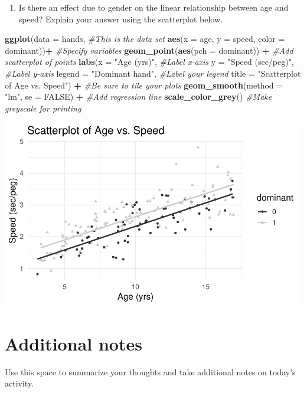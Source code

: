 \documentclass[
]{report}
\newenvironment{Shaded}{\begin{snugshade}}{\end{snugshade}}
\newcommand{\CommentTok}[1]{\textcolor[rgb]{0.56,0.35,0.01}{\textit{#1}}}
\newcommand{\DataTypeTok}[1]{\textcolor[rgb]{0.13,0.29,0.53}{#1}}
\newcommand{\KeywordTok}[1]{\textcolor[rgb]{0.13,0.29,0.53}{\textbf{#1}}}
\newcommand{\NormalTok}[1]{#1}
\newcommand{\OperatorTok}[1]{\textcolor[rgb]{0.81,0.36,0.00}{\textbf{#1}}}
\newcommand{\OtherTok}[1]{\textcolor[rgb]{0.56,0.35,0.01}{#1}}
\newcommand{\StringTok}[1]{\textcolor[rgb]{0.31,0.60,0.02}{#1}}
\providecommand{\tightlist}{%
  \setlength{\itemsep}{0pt}\setlength{\parskip}{0pt}}
\begin{document}
\begin{enumerate}
\def\labelenumi{\arabic{enumi}.}
\setcounter{enumi}{19}
\tightlist
\item
  Is there an effect due to gender on the linear relationship between age and speed? Explain your answer using the scatterplot below.
\end{enumerate}

\begin{Shaded}
\begin{Highlighting}[]
\KeywordTok{ggplot}\NormalTok{(}\DataTypeTok{data =}\NormalTok{ hands,   }\CommentTok{#This is the data set}
       \KeywordTok{aes}\NormalTok{(}\DataTypeTok{x =}\NormalTok{ age, }\DataTypeTok{y =}\NormalTok{ speed, }\DataTypeTok{color =}\NormalTok{ dominant))}\OperatorTok{+}\StringTok{  }\CommentTok{#Specify variables}
\StringTok{  }\KeywordTok{geom_point}\NormalTok{(}\KeywordTok{aes}\NormalTok{(}\DataTypeTok{pch =}\NormalTok{ dominant)) }\OperatorTok{+}\StringTok{  }\CommentTok{#Add scatterplot of points}
\StringTok{  }\KeywordTok{labs}\NormalTok{(}\DataTypeTok{x =} \StringTok{"Age (yrs)"}\NormalTok{,  }\CommentTok{#Label x-axis}
       \DataTypeTok{y =} \StringTok{"Speed (sec/peg)"}\NormalTok{,  }\CommentTok{#Label y-axis}
       \DataTypeTok{legend =} \StringTok{"Dominant hand"}\NormalTok{,  }\CommentTok{#Label your legend}
       \DataTypeTok{title =} \StringTok{"Scatterplot of Age vs. Speed"}\NormalTok{) }\OperatorTok{+}\StringTok{ }\CommentTok{#Be sure to tile your plots}
\StringTok{  }\KeywordTok{geom_smooth}\NormalTok{(}\DataTypeTok{method =} \StringTok{"lm"}\NormalTok{, }\DataTypeTok{se =} \OtherTok{FALSE}\NormalTok{) }\OperatorTok{+}\StringTok{  }\CommentTok{#Add regression line}
\StringTok{  }\KeywordTok{scale_color_grey}\NormalTok{() }\CommentTok{#Make greyscale for printing }
\end{Highlighting}
\end{Shaded}

\begin{center}\includegraphics[width=0.7\linewidth]{10-regression_files/figure-latex/unnamed-chunk-6-1} \end{center}

\hypertarget{additional-notes}{%
\section{Additional notes}\label{additional-notes}}

Use this space to summarize your thoughts and take additional notes on today's activity.
\end{document}
